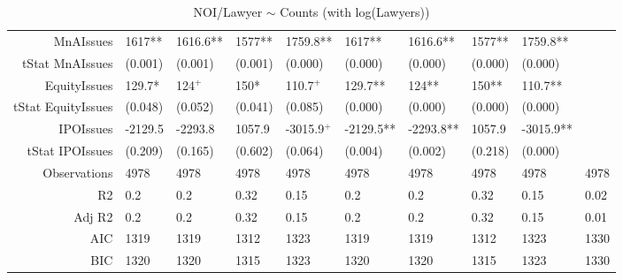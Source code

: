 \begin{table}[ht]
\begin{tabular}{rlllllllll}
  MnAIssues & 1617** & 1616.6** & 1577** & 1759.8** & 1617** & 1616.6** & 1577** & 1759.8** &  \\ 
  tStat MnAIssues & (0.001) & (0.001) & (0.001) & (0.000) & (0.000) & (0.000) & (0.000) & (0.000) &  \\ 
  EquityIssues & 129.7* & 124$^{+}$ & 150* & 110.7$^{+}$ & 129.7** & 124** & 150** & 110.7** &  \\ 
  tStat EquityIssues & (0.048) & (0.052) & (0.041) & (0.085) & (0.000) & (0.000) & (0.000) & (0.000) &  \\ 
  IPOIssues & -2129.5 & -2293.8 & 1057.9 & -3015.9$^{+}$ & -2129.5** & -2293.8** & 1057.9 & -3015.9** &  \\ 
  tStat IPOIssues & (0.209) & (0.165) & (0.602) & (0.064) & (0.004) & (0.002) & (0.218) & (0.000) &  \\ 
  Observations & 4978 & 4978 & 4978 & 4978 & 4978 & 4978 & 4978 & 4978 & 4978 \\ 
  R2 & 0.2 & 0.2 & 0.32 & 0.15 & 0.2 & 0.2 & 0.32 & 0.15 & 0.02 \\ 
  Adj R2 & 0.2 & 0.2 & 0.32 & 0.15 & 0.2 & 0.2 & 0.32 & 0.15 & 0.01 \\ 
  AIC & 1319 & 1319 & 1312 & 1323 & 1319 & 1319 & 1312 & 1323 & 1330 \\ 
  BIC & 1320 & 1320 & 1315 & 1323 & 1320 & 1320 & 1315 & 1323 & 1330 \\ 
   \hline
\end{tabular}
\caption{NOI/Lawyer $\sim$ Counts (with log(Lawyers))} 
\end{table}
